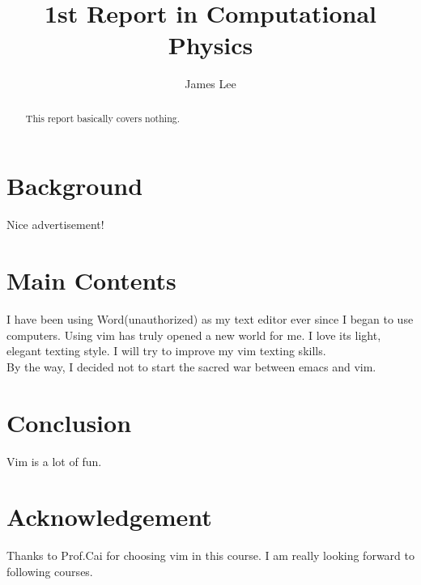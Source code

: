 \documentclass[10pt,a4paper]{article}
\author{James Lee}
\title{1st Report in Computational Physics}
\begin{document}
    \maketitle
    \begin{abstract}
    This report basically covers nothing.
    \end{abstract}
    \section{Background}
    Nice advertisement!
    \section{Main Contents}
    I have been using Word(unauthorized) as my text editor ever since I began to use computers. Using vim has truly opened a new world for me. I love its light, elegant texting style. I will try to improve my vim texting skills.\\
    By the way, I decided not to start the sacred war between emacs and vim.\\ 
    \section{Conclusion}
    Vim is a lot of fun.
    \section{Acknowledgement}
    Thanks to Prof.Cai for choosing vim in this course. I am really looking forward to following courses.
\end{document}

